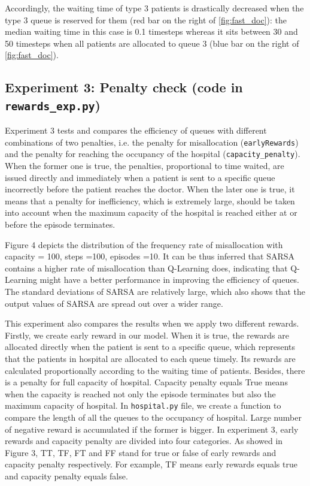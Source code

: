 \documentclass[11point]{article}
\begin{document}
Accordingly, the waiting time of type 3 patients is drastically decreased when the type 3 queue is reserved for them (red bar on the right of \autoref{fig:fast_doc}): the median waiting time in this case is 0.1 timesteps whereas it sits between 30 and 50 timesteps when all patients are allocated to queue 3 (blue bar on the right of \autoref{fig:fast_doc}).

\subsection{Experiment 3: Penalty check (code in \texttt{rewards\_exp.py})}
Experiment 3 tests and compares the efficiency of queues with different combinations of two penalties, i.e. the penalty for misallocation (\texttt{earlyRewards}) and the penalty for reaching the occupancy of the hospital (\texttt{capacity\_penalty}). When the former one is true, the penalties, proportional to time waited, are issued directly and immediately when a patient is sent to a specific queue incorrectly before the patient reaches the doctor. When the later one is true, it means that a penalty for inefficiency, which is extremely large, should be taken into account when the maximum capacity of the hospital is reached either at or before the episode terminates.

Figure 4 depicts the distribution of the frequency rate of misallocation with capacity = 100, steps =100, episodes =10. It can be thus inferred that SARSA contains a higher rate of misallocation than Q-Learning does, indicating that Q-Learning might have a better performance in improving the efficiency of queues. The standard deviations of SARSA are relatively large, which also shows that the output values of SARSA are spread out over a wider range.

This experiment also compares the results when we apply two different rewards. Firstly, we create early reward in our model. When it is true, the rewards are allocated directly when the patient is sent to a specific queue, which represents that the patients in hospital are allocated to each queue timely. Its rewards are calculated proportionally according to the waiting time of patients.
Besides, there is a penalty for full capacity of hospital. Capacity penalty equals True means when the capacity is reached not only the episode terminates but also the  maximum capacity of hospital. In \texttt{hospital.py} file, we create a function to compare the length of all the queues to the occupancy of hospital. Large number of negative reward is accumulated if the former is bigger. 
In experiment 3, early rewards and capacity penalty are divided into four categories. As showed in Figure 3, TT, TF, FT and FF stand for true or false of early rewards and capacity penalty respectively. For example, TF means early rewards equals true and capacity penalty equals false.
\end{document}
